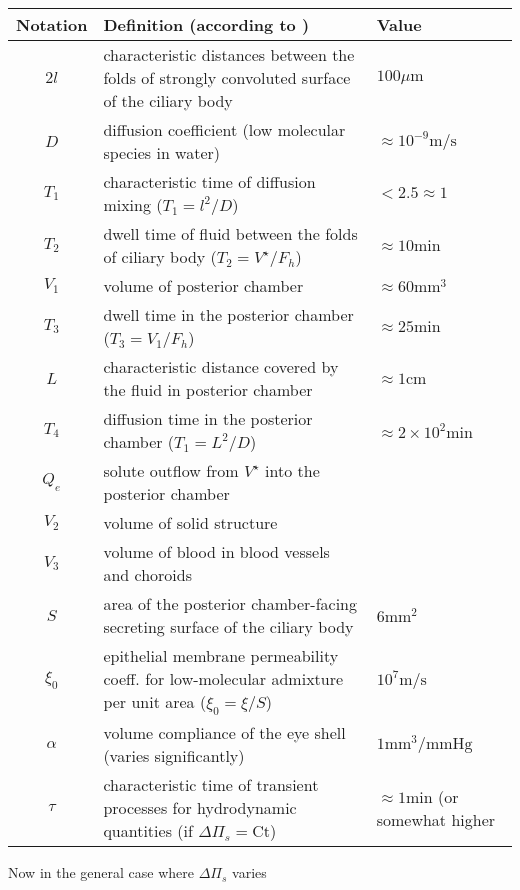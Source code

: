 \documentclass[11pt]{article}
\begin{document}
\begin{center}
\begin{tabular}{|c|p{}|l|}
\hline
Notation & Definition (according to \cite{lyubimov2007dynamics}) & Value \\
\hline
\hline
$2l$& characteristic distances between the folds of strongly convoluted surface of the ciliary body & $100 \mu \mathrm{m}$\\
\hline
$D$ & diffusion coefficient (low molecular species in water) & $\approx 10^{-9} \mathrm{m}/\mathrm{s}$\\
\hline
$T_1$ & characteristic time of diffusion mixing ($T_1 = l^2/D$)& $<2.5 \approx1$\\
\hline
$T_2$ & dwell time of fluid between the folds of ciliary body ($T_2 = V^\star /F_h$) & $\approx 10 \mathrm{min}$\\
\hline
$V_1$ & volume of posterior chamber & $\approx 60 \mathrm{mm}^3$\\
\hline
$T_3$ & dwell time in the posterior chamber ($T_3 = V_1 / F_h$) & $\approx 25 \mathrm{min}$\\
\hline
$L$ & characteristic distance covered by the fluid in posterior chamber & $ \approx 1 \mathrm{cm} $ \\
\hline
$T_4$& diffusion time in the posterior chamber ($T_1 = L^2/D$) & $\approx 2 \times 10^2 \mathrm{min}$
\\
\hline
$Q_e$ & solute outflow from $V^\star$ into the posterior chamber & \\
\hline
$V_2$ & volume of solid structure & \\
\hline
$V_3$ & volume of blood in blood vessels and choroids & \\
\hline
$S$ & area of the posterior chamber-facing secreting surface of the ciliary body & $6 \mathrm{mm}^2 $\\
\hline
$\xi_0$ & epithelial membrane permeability coeff. for low-molecular admixture per unit area ($\xi_0 = \xi/S$) & $ 10^7 \mathrm{
m}/\mathrm{s}$
\\
\hline
$\alpha$ & volume compliance of the eye shell (varies significantly)& $ 1 \mathrm{mm}^3/\mathrm{mmHg}$\\
\hline
$\tau$ & characteristic time of transient processes for hydrodynamic quantities (if $\Delta \Pi_s = \mathrm{Ct}$)&$\approx 1 \mathrm{min}$ (or somewhat higher\\
\hline
\hline
\end{tabular}
\end{center}
Now in the general case where $\Delta \Pi_s$ varies
\end{document}
